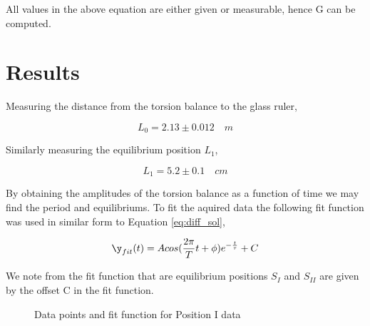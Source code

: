 \documentclass[twoside,twocolumn]{article}
\begin{document}
All values in the above equation are either given or measurable, hence G can be computed.


\section{Results}

Measuring the distance from the torsion balance to the glass ruler,

\begin{equation}
\label{eq:l_0}
L_{0} = 2.13 \pm 0.012 \quad m
\end{equation}

Similarly measuring the equilibrium position $L_{1}$,

\begin{equation}
\label{eq:l_1}
L_{1} = 5.2 \pm 0.1 \quad cm
\end{equation}

By obtaining the amplitudes of the torsion balance as a function of time we may find
the period and equilibriums. To fit the aquired data the following fit function was used
in similar form to Equation \ref{eq:diff_sol},

\begin{equation}
\label{eq:diff_sol}
\y_{fit}(t) = Acos(\frac{2\pi}{T} t + \phi)e^{-\frac{t}{\tau}} + C
\end{equation}

We note from the fit function that are equilibrium positions $S_{I}$ and $S_{II}$ are given by
the offset C in the fit function.

\begin{figure}[H]
\centering
  \begin{center}
  \end{center}
  \caption{Data points and fit function for Position I data}
\end{figure}
\label{fig:pos1_plot}
\end{document}
